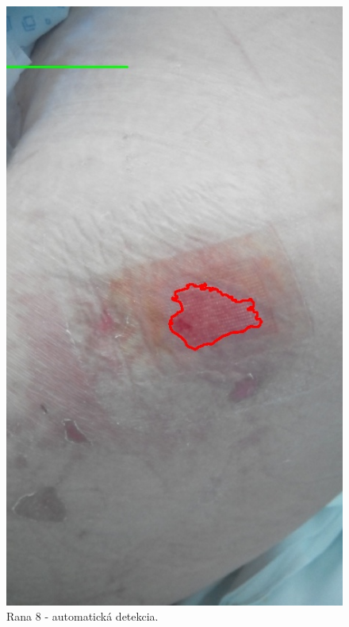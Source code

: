 \begin{figure}[h]
\begin{minipage}{0.48\textwidth}
     \includegraphics[scale=0.35]{fig/8a.jpeg}
      \caption{Rana 8 - automatická detekcia.}
      \label{fig:w8d}
   \end{minipage}
\end{figure}